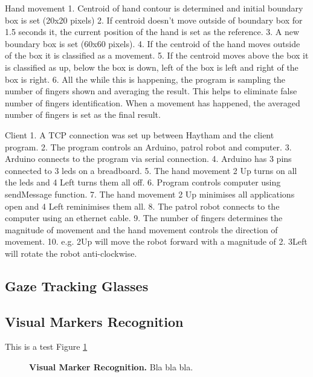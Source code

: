 \documentclass[jou,a4paper,notxfonts]{apa}
\begin{document}
Hand movement
1. Centroid of hand contour is determined and initial boundary box is set (20x20 pixels)
2. If centroid doesn't move outside of boundary box for 1.5 seconds it, the current position of the hand is set as the reference.
3. A new boundary box is set (60x60 pixels).
4. If the centroid of the hand moves outside of the box it is classified as a movement.
5. If the centroid moves above the box it is classified as up, below the box is down, left of the box is left and right of the box is right.
6. All the while this is happening, the program is sampling the number of fingers shown and averaging the result. This helps to eliminate
false number of fingers identification. When a movement has happened, the averaged number of fingers is set as the final result.

Client
1. A TCP connection was set up between Haytham and the client program.
2. The program controls an Arduino, patrol robot and computer.
3. Arduino connects to the program via serial connection.
4. Arduino has 3 pins connected to 3 leds on a breadboard.
5. The hand movement 2 Up turns on all the leds and 4 Left turns them all off.
6. Program controls computer using sendMessage function.
7. The hand movement 2 Up minimises all applications open and 4 Left reminimises them all.
8. The patrol robot connects to the computer using an ethernet cable.
9. The number of fingers determines the magnitude of movement and the hand movement controls the direction of movement.
10. e.g. 2Up will move the robot forward with a magnitude of 2. 3Left will rotate the robot anti-clockwise.

\subsection{Gaze Tracking Glasses}

\subsection{Visual Markers Recognition}

This is a test Figure \ref{visualMarker}

\begin{figure}[tp]
 \caption{\textbf{Visual Marker Recognition.} Bla bla bla.}
 \label{visualMarker}
\end{figure}
\end{document}
